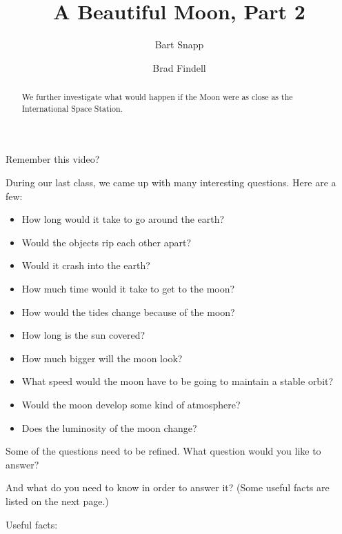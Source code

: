 \documentclass{ximera}
\title{A Beautiful Moon, Part 2}
\author{Bart Snapp \and Brad Findell}
\begin{document}
\begin{abstract}
We further investigate what would happen if the Moon were as close as the
International Space Station.
\end{abstract}
\maketitle
Remember this video?  

\begin{problem}
 During our last class, we came up with many interesting questions.   Here are a few:

\begin{itemize}
\item How long would it take to go around the earth? 
\item Would the objects rip each other apart? 
\item Would it crash into the earth? 
\item How much time would it take to get to the moon?
\item How would the tides change because of the moon? 
\item How long is the sun covered? 
\item How much bigger will the moon look? 
\item What speed would the moon have to be going to maintain a stable orbit? 
\item Would the moon develop some kind of atmosphere? 
\item Does the luminosity of the moon change? 
 \end{itemize}

Some of the questions need to be refined.  What question would you like to answer?  

And what do you need to know in order to answer it?  (Some useful facts are listed on the next page.)  

\newpage
Useful facts:   
 

\end{problem}
\end{document}
